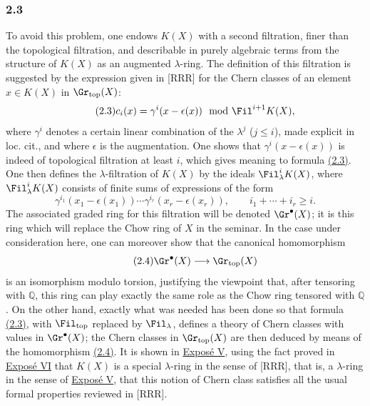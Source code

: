 \subsubsection*{2.3}
To avoid this problem, one endows $K(X)$ with a second filtration, finer than the topological filtration, and describable in purely algebraic terms from the structure of $K(X)$ as an augmented $\lambda$-ring. The definition of this filtration is suggested by the expression given in [RRR] for the Chern classes of an element $x\in K(X)$ in $\Gr_{\mathrm{top}}(X)$:
\begin{equation}\tag{2.3}
c_i(x)=\gamma^i(x-\epsilon(x))\mod \Fil^{i+1}K(X),
\end{equation}
where $\gamma^i$ denotes a certain linear combination of the $\lambda^j$ ($j\le i$), made explicit in loc. cit., and where $\epsilon$ is the augmentation. One shows that $\gamma^i(x-\epsilon(x))$ is indeed of topological filtration at least $i$, which gives meaning to formula \hyperlink{sga6.e00.eq.2-3}{(2.3)}. One then defines the $\lambda$-filtration of $K(X)$ by the ideals $\Fil^i_\lambda K(X)$, where $\Fil^i_\lambda K(X)$ consists of finite sums of expressions of the form
\[
\gamma^{i_1}(x_1-\epsilon(x_1))\cdots \gamma^{i_r}(x_r-\epsilon(x_r)),\qquad i_1+\cdots+i_r\ge i.
\]
The associated graded ring for this filtration will be denoted $\Gr^\bullet(X)$; it is this ring which will replace the Chow ring of $X$ in the seminar. In the case under consideration here, one can moreover show that the canonical homomorphism
\begin{equation}\tag{2.4}
\Gr^\bullet(X)\longrightarrow \Gr_{\mathrm{top}}(X)
\end{equation}
is an isomorphism modulo torsion, justifying the viewpoint that, after tensoring with $\mathbb Q$, this ring can play exactly the same role as the Chow ring tensored with $\mathbb Q$. On the other hand, exactly what was needed has been done so that formula \hyperlink{sga6.e00.eq.2-3}{(2.3)}, with $\Fil_{\mathrm{top}}$ replaced by $\Fil_\lambda$, defines a theory of Chern classes with values in $\Gr^\bullet(X)$; the Chern classes in $\Gr_{\mathrm{top}}(X)$ are then deduced by means of the homomorphism \hyperlink{sga6.e00.eq.2-4}{(2.4)}. It is shown in \hyperlink{sga6.e05.expose}{Exposé V}, using the fact proved in \hyperlink{sga6.e06.expose}{Exposé VI} that $K(X)$ is a special $\lambda$-ring in the sense of [RRR], that is, a $\lambda$-ring in the sense of \hyperlink{sga6.e05.expose}{Exposé V}, that this notion of Chern class satisfies all the usual formal properties reviewed in [RRR].

